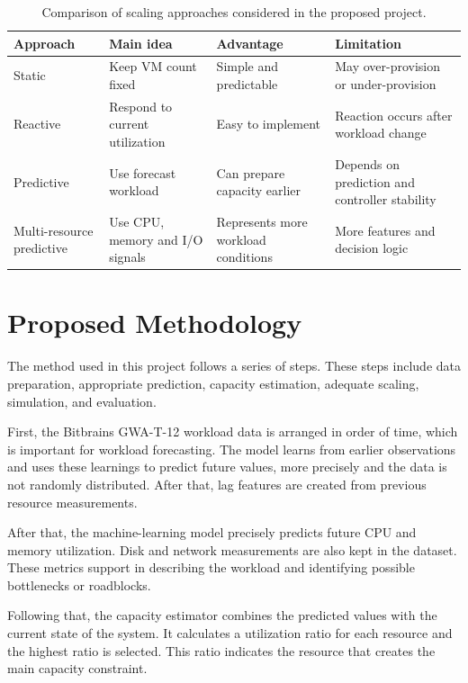 \documentclass[10pt,journal,compsoc]{IEEEtran}
\begin{document}
\begin{table}[htbp]
\caption{Comparison of scaling approaches considered in the proposed project.}
\centering
\begin{tabular}{|p{1.8cm}|p{1.8cm}|p{1.8cm}|p{1.8cm}|}
\hline
\textbf{Approach} & \textbf{Main idea} & \textbf{Advantage} & \textbf{Limitation} \\ \hline
Static & Keep VM count fixed & Simple and predictable & May over-provision or under-provision \\ \hline
Reactive & Respond to current utilization & Easy to implement & Reaction occurs after workload change \\ \hline
Predictive & Use forecast workload & Can prepare capacity earlier & Depends on prediction and controller stability \\ \hline
Multi-resource predictive & Use CPU, memory and I/O signals & Represents more workload conditions & More features and decision logic \\ \hline
\end{tabular}
\label{tab:approaches}
\end{table}

\section{Proposed Methodology}
The method used in this project follows a series of steps. These steps include data preparation, appropriate prediction, capacity estimation, adequate scaling, simulation, and evaluation.

First, the Bitbrains GWA-T-12 workload data is arranged in order of time, which is important for workload forecasting. The model learns from earlier observations and uses these learnings to predict future values, more precisely and the data is not randomly distributed. After that, lag features are created from previous resource measurements.

After that, the machine-learning model precisely predicts future CPU and memory utilization. Disk and network measurements are also kept in the dataset. These metrics support in describing the workload and identifying possible bottlenecks or roadblocks.

Following that, the capacity estimator combines the predicted values with the current state of the system. It calculates a utilization ratio for each resource and the highest ratio is selected. This ratio indicates the resource that creates the main capacity constraint.
\end{document}
